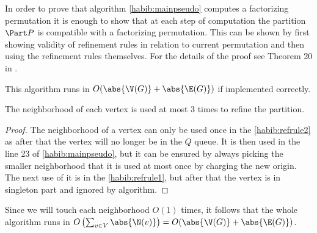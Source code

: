 In order to prove that algorithm \ref{habib:mainpseudo} computes a factorizing permutation it is enough to show that at each step of computation the partition $\Part P$ is compatible with a factorizing permutation. This can be shown by first showing validity of refinement rules in relation to current permutation and then using the refinement rules themselves. For the details of the proof see Theorem 20 in \cite{habib}.

This algorithm runs in $O(\abs{\V(G)} + \abs{\E(G)})$ if implemented correctly.

\begin{lemma}
    The neighborhood of each vertex is used at most 3 times to refine the partition.
\end{lemma}
\begin{proof}
    The neighborhood of a vertex can only be used once in the \ref{habib:refrule2} as after that the vertex will no longer be in the $Q$ queue. It is then used in the line 23 of \ref{habib:mainpseudo}, but it can be ensured by always picking the smaller neighborhood that it is used at most once by charging the new origin. The next use of it is in the \ref{habib:refrule1}, but after that the vertex is in singleton part and ignored by algorithm.
\end{proof}

Since we will touch each neighborhood $O(1)$ times, it follows that the whole algorithm runs in $O\left(\sum_{v\in V} \abs{\N(v)}\right) = O(\abs{\V(G)} + \abs{\E(G)})$.